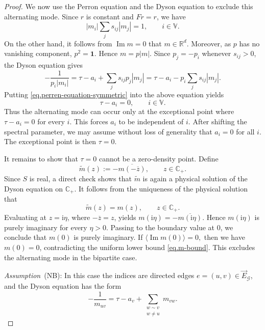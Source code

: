 \documentclass[11pt,twoside, a4paper]{article}
\numberwithin{equation}{section}
\numberwithin{figure}{section}
\theoremstyle{plain} %
\theoremstyle{definition}
\theoremstyle{remark}
\newcommand{\1} {\mspace{1 mu}}
\newcommand{\2} {\mspace{2 mu}}
\DeclareMathOperator{\im}{Im}
\begin{document}
\begin{proof}
    We now use the Perron equation and the Dyson equation to exclude this alternating mode.
    Since \(r\) is constant and \(Fr=r\), we have
    \begin{equation}\label{eq.perren-equation-symmetric}
      |m_i|\sum_j s_{ij}|m_j|=1,\qquad i\in\mathbb V .
    \end{equation}
    On the other hand, it follows from \(\im m=0\) that \(m\in\mathbb R^d\). Moreover, as \(p\) has no vanishing component, \(p^2=\mathbf 1\). Hence
    $
    m=p|m|.
    $
    Since \(p_j=-p_i\) whenever \(s_{ij}>0\), the Dyson equation gives
    \[
        -\frac1{p_i|m_i|}
        =
        \tau-a_i+\sum_j s_{ij}p_j|m_j|
        =
        \tau-a_i
        -
        p_i\sum_j s_{ij}|m_j| .
    \]
    Putting \eqref{eq.perren-equation-symmetric} into the above equation yields
    \[
        \tau-a_i=0, \qquad i\in\mathbb V .
    \]
    Thus the alternating mode can occur only at the exceptional point where
    \(\tau-a_i=0\) for every \(i\). This forces \(a_i\) to be independent of
    \(i\). After shifting the spectral parameter, we may assume without loss of
    generality that \(a_i=0\) for all \(i\). The exceptional point is then
    \(\tau=0\).



    It remains to show that \(\tau=0\) cannot be a zero-density point. Define 
    \[ 
    \widetilde m(z):=-\overline{m(-\overline z)}, \qquad z\in\mathbb C_+. 
    \] 
    Since \(S\) is real, a direct check shows that \(\widetilde m\) is again a physical solution of the Dyson equation on \(\mathbb C_+\). 
    It follows from the uniqueness of the physical solution that  
    \begin{equation}\label{eq.invariant-transformation}
        \widetilde m(z)=m(z),\qquad z\in\mathbb C_+.
    \end{equation}
    Evaluating at \(z=\mathrm i\eta\), where \(-\overline z=z\), yields $ m(\mathrm i\eta)=-\overline{m(\mathrm i\eta)}$.  Hence \(m(\mathrm i\eta)\) is purely imaginary for every \(\eta>0\). Passing to the boundary value at \(0\), we conclude that \(m(0)\) is purely imaginary.
    If
    $
        \langle \im m(0)\rangle=0,
    $
    then we have \(m(0)=0\), contradicting the uniform lower bound \eqref{eq.m-bound}. This excludes
    the alternating mode in the bipartite case.




      \smallskip
      \textit{Assumption}~(NB):  In this case the
      indices are directed edges \(e=(u,v)\in \vec E_{\mathcal G}\), and the Dyson equation has the form
      \begin{equation}\label{eq.qve-NB}
        -\frac1{m_{uv}}
          =
          \tau-a_v+\sum_{\substack{w\sim v\\ w\ne u}}m_{vw}.
      \end{equation}
        



\end{proof}
\end{document}
